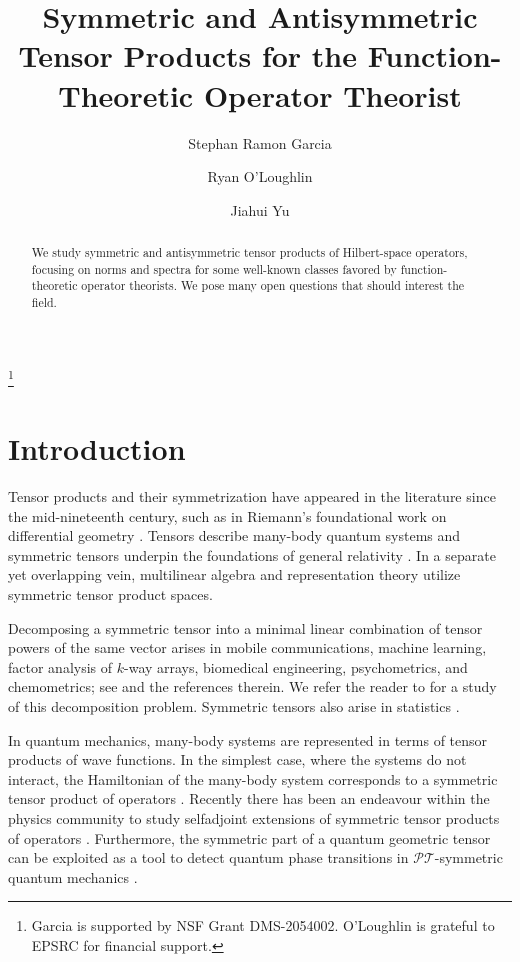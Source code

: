 \documentclass[10pt,reqno]{amsart}
\author{Stephan Ramon Garcia}
\author{Ryan O'Loughlin}
\author{Jiahui Yu}
\newcommand{\0}{{\color{lightgray}0}}
\theoremstyle{definition}
\newcounter{problem}
\numberwithin{equation}{section}
\begin{document}
\title[Symmetric and Antisymmetric Tensor Products]{Symmetric and Antisymmetric Tensor Products for the Function-Theoretic Operator Theorist}

\thanks{Garcia is supported by NSF Grant DMS-2054002. O'Loughlin is grateful to EPSRC for financial support.}



\maketitle
\begin{abstract}
We study symmetric and antisymmetric tensor products of Hilbert-space operators, focusing on norms and spectra for some well-known classes favored by function-theoretic operator theorists.  We pose many open questions that should interest the field.
\end{abstract}


\section{Introduction}
Tensor products and their symmetrization have appeared in the literature since the mid-nineteenth century,  such as in Riemann's foundational work on differential geometry \cite{RMN1, RMN2}. 
Tensors describe many-body quantum systems \cite{naber2021quantum} and symmetric tensors underpin the foundations of general relativity \cite{diffgeom}. In a separate yet overlapping vein, multilinear algebra \cite{multbook} and representation theory \cite{repbook} utilize symmetric tensor product spaces.  

Decomposing a symmetric tensor into a minimal linear combination of tensor powers of the same vector arises in mobile communications, machine learning, factor analysis of $k$-way arrays, biomedical engineering, psychometrics, and chemometrics; see\cite{ref2, ref3, ref4, ref5, ref6} and the references therein. We refer the reader to \cite{refmain} for a study of this decomposition problem. Symmetric tensors also arise in statistics \cite{statreference}.

In quantum mechanics, many-body systems are represented in terms of tensor products of wave functions. In the simplest case, where the systems do not interact, the Hamiltonian of the many-body system corresponds to a symmetric tensor product of operators
\cite[Ch.~4, Sec.~9]{Kostrikinbook}. 
Recently there has been an endeavour within the physics community to study selfadjoint extensions of symmetric tensor products of operators  \cite{ext1, ext2, ext3}. Furthermore, the symmetric part of a quantum geometric tensor can be exploited as a tool to detect quantum phase transitions in $\mathcal{PT}$-symmetric quantum mechanics \cite{quantsym}.
\end{document}
